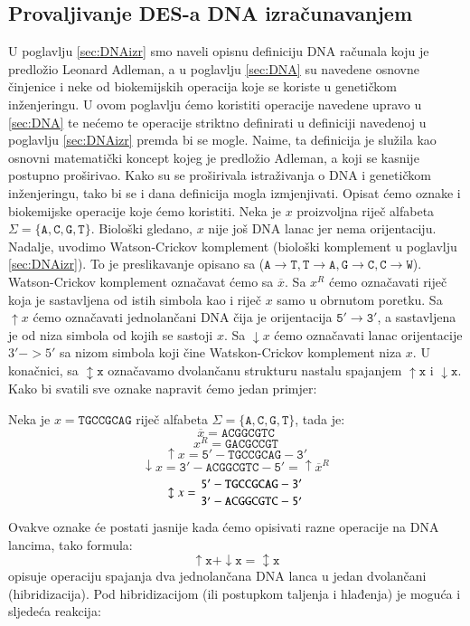\documentclass[a4paper,oneside,12pt]{memoir} %
\begin{document}
\begin{spacing}{1.5}
\subsection{Provaljivanje DES-a DNA izračunavanjem}
U poglavlju \ref{sec:DNAizr} smo naveli opisnu definiciju DNA računala koju je predložio Leonard Adleman, a u poglavlju \ref{sec:DNA} su navedene osnovne činjenice i neke od biokemijskih operacija koje se koriste u genetičkom inženjeringu. U ovom poglavlju ćemo koristiti operacije navedene upravo u \ref{sec:DNA} te nećemo te operacije striktno definirati u definiciji navedenoj u poglavlju \ref{sec:DNAizr} premda bi se mogle. Naime, ta definicija je služila kao osnovni matematički koncept kojeg je predložio Adleman, a koji se kasnije postupno proširivao. Kako su se proširivala istraživanja o DNA i genetičkom inženjeringu, tako bi se i dana definicija mogla izmjenjivati. Opisat ćemo oznake i biokemijske operacije koje ćemo koristiti.
Neka je $x$ proizvoljna riječ alfabeta $\Sigma =\{\mathtt{A,C,G,T}\}$. Biološki gledano, $x$ nije još DNA lanac jer nema orijentaciju. Nadalje, uvodimo Watson-Crickov komplement (biološki komplement u poglavlju \ref{sec:DNAizr}). To je preslikavanje opisano sa ($\mathtt{A \to T, T \to A, G \to C, C \to W}$). Watson-Crickov komplement označavat ćemo sa $\overline{x}$. Sa $x^R$ ćemo označavati riječ koja je sastavljena od istih simbola kao i riječ $x$ samo u obrnutom poretku. Sa $\mathtt{\uparrow} x$ ćemo označavati  jednolančani DNA čija je orijentacija $\mathtt{5' \to 3'}$, a sastavljena  je od niza simbola od kojih se sastoji $x$. Sa $\downarrow x$ ćemo označavati lanac orijentacije $3'->5'$ sa nizom simbola koji čine Watskon-Crickov komplement niza $x$. U konačnici, sa $\mathtt{\updownarrow x}$ označavamo dvolančanu strukturu nastalu spajanjem $\mathtt{\uparrow x}$ i $\mathtt{\downarrow x}$. Kako bi svatili sve oznake napravit ćemo jedan primjer:
\begin{exa}
Neka je $x=\mathtt{TGCCGCAG}$ riječ alfabeta $\Sigma=\mathtt{\{A,C,G,T\}}$, tada je:
\[\overline{x}= \mathtt{ACGGCGTC}\]
\[x^R=\mathtt{GACGCCGT}\]
\[\uparrow x=\mathtt{5'-TGCCGCAG-3'}\]
\[\downarrow x=\mathtt{3'-ACGGCGTC-5'}=	\uparrow \overline{x}^R\]
\[\updownarrow x=\mathtt{{5'-TGCCGCAG-3' \atop 3'-ACGGCGTC-5'}}\]
\end{exa}
Ovakve oznake će postati jasnije kada ćemo opisivati razne operacije  na DNA lancima, tako formula:
\[\mathtt{\uparrow x + \downarrow x=\updownarrow x}\]
opisuje operaciju spajanja dva jednolančana DNA lanca u jedan dvolančani (hibridizacija). Pod hibridizacijom (ili postupkom taljenja i hlađenja) je moguća i sljedeća reakcija:

\end{spacing}
\end{document}
